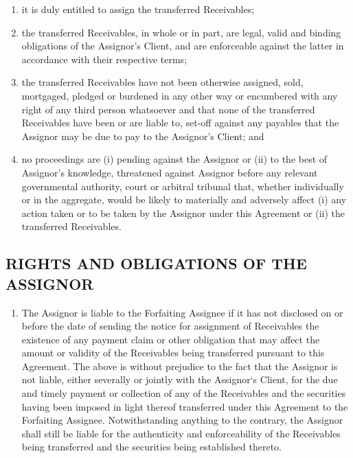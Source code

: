 \documentclass[a4paper]{article}
\begin{document}
\begin{multicols}{2}
\begin{enumerate}
\begin{enumerate}
    \item{it is duly entitled to assign the transferred Receivables;}

    \item{the transferred Receivables, in whole or in part, are legal,
        valid and binding obligations of the Assignor’s Client, and
        are enforceable against the latter in accordance with their
        respective terms;}

    \item{the transferred Receivables have not been otherwise
        assigned, sold, mortgaged, pledged or burdened in any other
        way or encumbered with any right of any third person
        whatsoever and that none of the transferred Receivables have
        been or are liable to, set{-}off against any payables that the
        Assignor may be due to pay to the Assignor’s Client; and}

    \item{no proceedings are (i) pending against the Assignor or (ii)
        to the best of Assignor's knowledge, threatened against
        Assignor before any relevant governmental authority, court or
        arbitral tribunal that, whether individually or in the
        aggregate, would be likely to materially and adversely affect
        (i) any action taken or to be taken by the Assignor under this
        Agreement or (ii) the transferred Receivables.}
    \end{enumerate}
  \end{enumerate}

  \subsection{RIGHTS AND OBLIGATIONS OF THE ASSIGNOR}

  \begin{enumerate}
  \item{The Assignor is liable to the Forfaiting Assignee if it has
      not disclosed on or before the date of sending the notice for
      assignment of Receivables the existence of any payment claim or
      other obligation that may affect the amount or validity of the
      Receivables being transferred pursuant to this Agreement. The
      above is without prejudice to the fact that the Assignor is not
      liable, either severally or jointly with the Assignor‘s Client,
      for the due and timely payment or collection of any of the
      Receivables and the securities having been imposed in light
      thereof transferred under this Agreement to the Forfaiting
      Assignee. Notwithstanding anything to the contrary, the Assignor
      shall still be liable for the authenticity and enforceability of
      the Receivables being transferred and the securities being
      established thereto.}



\end{enumerate}
\end{multicols}
\end{document}
